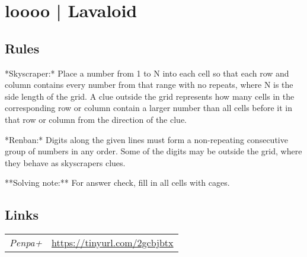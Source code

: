 \section[loooo | Lavaloid {[\emph{Renban Skyscrapers}]}]{loooo | {\normalfont Lavaloid}}
\label{sec:18-loooo-lavaloid}

\subsection*{Rules}
\begin{markdown}
*Skyscraper:* Place a number from 1 to N into each cell so that each row and column contains every number from that range with no repeats, where N is the side length of the grid. A clue outside the grid represents how many cells in the corresponding row or column contain a larger number than all cells before it in that row or column from the direction of the clue.



*Renban:* Digits along the given lines must form a non-repeating consecutive group of numbers in any order. Some of the digits may be outside the grid, where they behave as skyscrapers clues.



**Solving note:** For answer check, fill in all cells with cages.
\end{markdown}
\subsection*{Links}
\begin{tabularx}{\textwidth}{l X}
\emph{Penpa+} & \url{https://tinyurl.com/2gcbjbtx} \\
\end{tabularx}
\pagebreak
